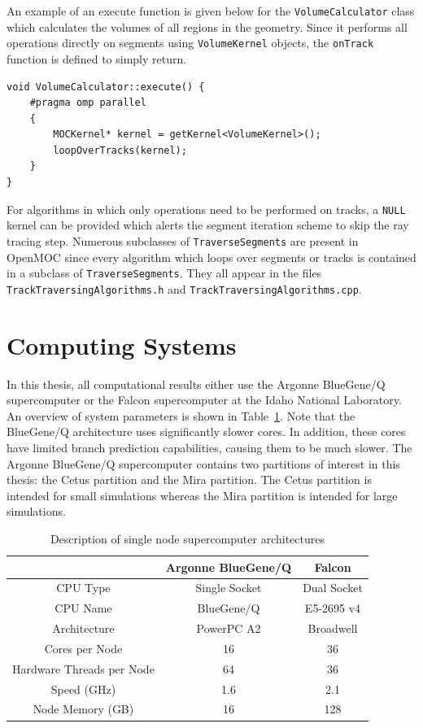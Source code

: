 An example of an execute function is given below for the \texttt{VolumeCalculator} class which calculates the volumes of all regions in the geometry. Since it performs all operations directly on segments using \texttt{VolumeKernel} objects, the \texttt{onTrack} function is defined to simply return.

\begin{center}
\begin{lstlisting}
void VolumeCalculator::execute() {
	#pragma omp parallel
	{
		MOCKernel* kernel = getKernel<VolumeKernel>();
		loopOverTracks(kernel);
	}
}
\end{lstlisting}
\end{center}

For algorithms in which only operations need to be performed on tracks, a \texttt{NULL} kernel can be provided which alerts the segment iteration scheme to skip the ray tracing step. Numerous subclasses of \texttt{TraverseSegments} are present in OpenMOC since every algorithm which loops over segments or tracks is contained in a subclass of \texttt{TraverseSegments}. They all appear in the files \texttt{TrackTraversingAlgorithms.h} and \texttt{TrackTraversingAlgorithms.cpp}.

\section{Computing Systems}
\label{sec:computing-systems}

In this thesis, all computational results either use the Argonne BlueGene/Q supercomputer or the Falcon supercomputer at the Idaho National Laboratory. An overview of system parameters is shown in Table~\ref{tab:system-params}. Note that the BlueGene/Q architecture uses significantly slower cores. In addition, these cores have limited branch prediction capabilities, causing them to be much slower. The Argonne BlueGene/Q supercomputer contains two partitions of interest in this thesis: the Cetus partition and the Mira partition. The Cetus partition is intended for small simulations whereas the Mira partition is intended for large simulations.

\begin{table}[ht]
	\centering
	\caption{Description of single node supercomputer architectures}
	\medskip
	\begin{tabular}{c|c|c}
		\hline
		& Argonne BlueGene/Q & Falcon\\
		\hline
		CPU Type & Single Socket & Dual Socket \\
		CPU Name & BlueGene/Q & E5-2695 v4 \\
		Architecture & PowerPC A2 & Broadwell\\
		Cores per Node & 16 & 36\\
		Hardware Threads per Node & 64 & 36\\
		Speed (GHz) & 1.6 & 2.1\\
		Node Memory (GB) & 16 & 128 \\
		\hline
	\end{tabular}
	\label{tab:system-params}
\end{table}

